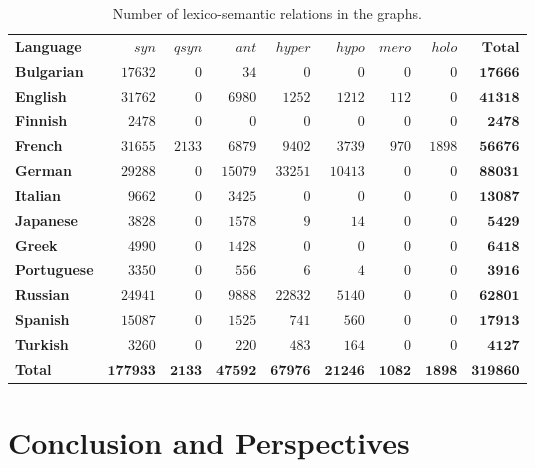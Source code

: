 \documentclass[10pt, a4paper]{article}
\begin{document}
\begin{table}[htb]
\begin{small}
\begin{tabular}{lrrrrrrrr}
\hline
\textbf{Language} & $syn$ & $qsyn$ & $ant$ & $hyper$ & $hypo$ & $mero$ & $holo$ & $\mathbf{Total}$ \\
\textbf{Bulgarian} & $17632$ & $0$ & $34$ & $0$ & $0$ & $0$ & $0$ & $\mathbf{17666}$ \\
\textbf{English} & $31762$ & $0$ & $6980$ & $1252$ & $1212$ & $112$ & $0$ & $\mathbf{41318}$ \\
\textbf{Finnish} & $2478$ & $0$ & $0$ & $0$ & $0$ & $0$ & $0$ & $\mathbf{2478}$ \\
\textbf{French} & $31655$ & $2133$ & $6879$ & $9402$ & $3739$ & $970$ & $1898$ & $\mathbf{56676}$ \\
\textbf{German} & $29288$ & $0$ & $15079$ & $33251$ & $10413$ & $0$ & $0$ & $\mathbf{88031}$ \\
\textbf{Italian} & $9662$ & $0$ & $3425$ & $0$ & $0$ & $0$ & $0$ & $\mathbf{13087}$ \\
\textbf{Japanese} & $3828$ & $0$ & $1578$ & $9$ & $14$ & $0$ & $0$ & $\mathbf{5429}$ \\
\textbf{Greek} & $4990$ & $0$ & $1428$ & $0$ & $0$ & $0$ & $0$ & $\mathbf{6418}$ \\
\textbf{Portuguese} & $3350$ & $0$ & $556$ & $6$ & $4$ & $0$ & $0$ & $\mathbf{3916}$ \\
\textbf{Russian} & $24941$ & $0$ & $9888$ & $22832$ & $5140$ & $0$ & $0$ & $\mathbf{62801}$ \\
\textbf{Spanish} & $15087$ & $0$ & $1525$ & $741$ & $560$ & $0$ & $0$ & $\mathbf{17913}$ \\
\textbf{Turkish} & $3260$ & $0$ & $220$ & $483$ & $164$ & $0$ & $0$ & $\mathbf{4127}$ \\
\textbf{Total} & $\mathbf{177933}$ & $\mathbf{2133}$ & $\mathbf{47592}$ & $\mathbf{67976}$ & $\mathbf{21246}$ & $\mathbf{1082}$ & $\mathbf{1898}$ & $\mathbf{319860}$ \\
\end{tabular}
\end{small}
\caption{Number of lexico-semantic relations in the graphs.}
\label{table:rels}
\end{table}



\section{Conclusion and Perspectives}
\end{document}
